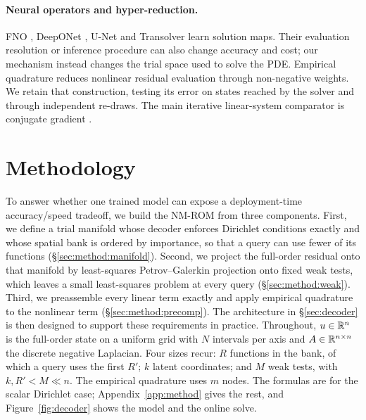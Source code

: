 \documentclass{article}
\begin{document}
\paragraph{Neural operators and hyper-reduction.}
FNO \citep{Li2020FNO}, DeepONet \citep{Lu2021DeepONet}, U-Net
\citep{Ronneberger2015UNet,Takamoto2022PDEBench} and Transolver
\citep{WuTransolver2024} learn solution maps. Their evaluation resolution
or inference procedure can also change accuracy and cost; our mechanism
instead changes the trial space used to solve the PDE. Empirical
quadrature \citep{Hernandez2017EQ,YanoPatera2019LPEQ} reduces nonlinear
residual evaluation through non-negative weights. We retain that
construction, testing its error on states reached by the solver and
through independent re-draws. The main iterative linear-system
comparator is conjugate gradient \citep{HestenesStiefel1952CG}.

\section{Methodology}\label{sec:method}
\edef\restoredisplays{%
  \noexpand\abovedisplayskip=\the\abovedisplayskip
  \noexpand\belowdisplayskip=\the\belowdisplayskip
  \noexpand\abovedisplayshortskip=\the\abovedisplayshortskip
  \noexpand\belowdisplayshortskip=\the\belowdisplayshortskip}
\setlength{\abovedisplayskip}{1pt plus 1pt minus 1pt}
\setlength{\belowdisplayskip}{1pt plus 1pt minus 1pt}
\setlength{\abovedisplayshortskip}{1pt plus 1pt minus 1pt}
\setlength{\belowdisplayshortskip}{1pt plus 1pt minus 1pt}

To answer whether one trained model can expose a deployment-time
accuracy/speed tradeoff, we build the NM-ROM from three components.
First, we define a trial manifold whose decoder enforces Dirichlet
conditions exactly and whose spatial bank is ordered by importance, so
that a query can use fewer of its functions
(\S\ref{sec:method:manifold}). Second, we project the full-order residual
onto that manifold by least-squares Petrov--Galerkin projection onto fixed
weak tests, which leaves a small least-squares problem at every query
(\S\ref{sec:method:weak}). Third, we preassemble every linear term exactly
and apply empirical quadrature to the nonlinear term
(\S\ref{sec:method:precomp}). The architecture in \S\ref{sec:decoder} is
then designed to support these requirements in practice. Throughout,
$u\in\mathbb{R}^{n}$ is the full-order state on a uniform grid with $N$
intervals per axis and $A\in\mathbb{R}^{n\times n}$ the discrete negative
Laplacian. Four sizes recur: $R$ functions in the bank, of which a query
uses the first $R'$; $k$ latent coordinates; and $M$ weak tests, with
$k,R'<M\ll n$. The empirical quadrature uses $m$ nodes. The formulas are
for the scalar Dirichlet case; Appendix~\ref{app:method} gives the rest,
and Figure~\ref{fig:decoder} shows the model and the online solve.
\end{document}
